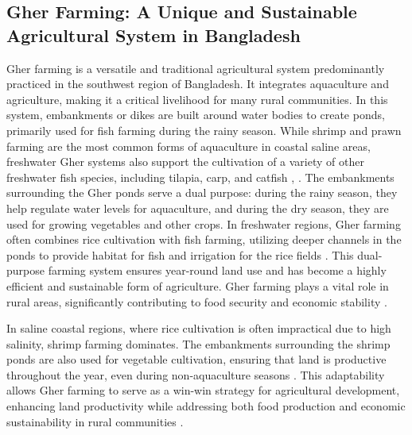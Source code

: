\documentclass[conference]{IEEEtran}
\begin{document}
\subsection{\textbf{Gher Farming: A Unique and Sustainable Agricultural System in Bangladesh}}
Gher farming is a versatile and traditional agricultural system predominantly practiced in the southwest region of Bangladesh. It integrates aquaculture and agriculture, making it a critical livelihood for many rural communities. In this system, embankments or dikes are built around water bodies to create ponds, primarily used for fish farming during the rainy season. While shrimp and prawn farming are the most common forms of aquaculture in coastal saline areas, freshwater Gher systems also support the cultivation of a variety of other freshwater fish species, including tilapia, carp, and catfish \cite{ref1}, \cite{ref5}. The embankments surrounding the Gher ponds serve a dual purpose: during the rainy season, they help regulate water levels for aquaculture, and during the dry season, they are used for growing vegetables and other crops. In freshwater regions, Gher farming often combines rice cultivation with fish farming, utilizing deeper channels in the ponds to provide habitat for fish and irrigation for the rice fields \cite{ref3}. This dual-purpose farming system ensures year-round land use and has become a highly efficient and sustainable form of agriculture. Gher farming plays a vital role in rural areas, significantly contributing to food security and economic stability \cite{ref2}.

In saline coastal regions, where rice cultivation is often impractical due to high salinity, shrimp farming dominates. The embankments surrounding the shrimp ponds are also used for vegetable cultivation, ensuring that land is productive throughout the year, even during non-aquaculture seasons \cite{ref4}. This adaptability allows Gher farming to serve as a win-win strategy for agricultural development, enhancing land productivity while addressing both food production and economic sustainability in rural communities \cite{ref5}.
\end{document}
